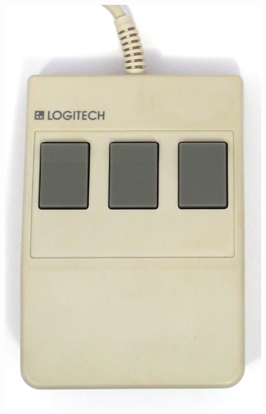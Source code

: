 \documentclass[11pt, a4paper]{article}
\begin{document}
\begin{figure}[h]
    \centering
    \includegraphics[scale=0.4]{1985_logitech_c7_mouse/top_30.jpg}

\end{figure}
\end{document}
